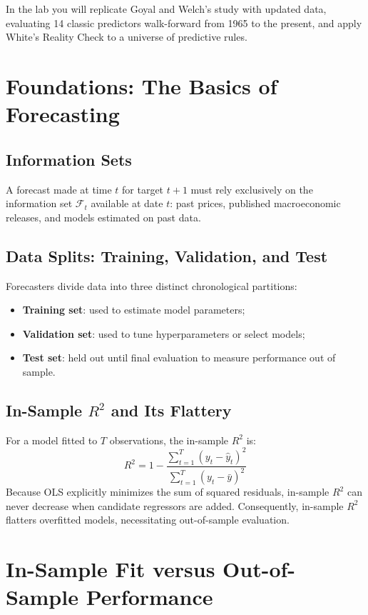 In the lab you will replicate Goyal and Welch's study with updated data, evaluating 14 classic predictors walk-forward from 1965 to the present, and apply White's Reality Check to a universe of predictive rules.

\section{Foundations: The Basics of Forecasting}
\label{sec:05-foundations}

\subsection{Information Sets}
A forecast made at time $t$ for target $t+1$ must rely exclusively on the information set $\mathcal{F}_t$ available at date $t$: past prices, published macroeconomic releases, and models estimated on past data.

\subsection{Data Splits: Training, Validation, and Test}
Forecasters divide data into three distinct chronological partitions:
\begin{itemize}
  \item \textbf{Training set}: used to estimate model parameters;
  \item \textbf{Validation set}: used to tune hyperparameters or select models;
  \item \textbf{Test set}: held out until final evaluation to measure performance out of sample.
\end{itemize}

\subsection{In-Sample $R^2$ and Its Flattery}
For a model fitted to $T$ observations, the in-sample $R^2$ is:
\begin{equation}
  R^2 = 1 - \frac{\sum_{t=1}^T (y_t - \hat{y}_t)^2}{\sum_{t=1}^T (y_t - \bar{y})^2}
  \label{eq:05-r2}
\end{equation}
Because OLS explicitly minimizes the sum of squared residuals, in-sample $R^2$ can never decrease when candidate regressors are added. Consequently, in-sample $R^2$ flatters overfitted models, necessitating out-of-sample evaluation.

\section{In-Sample Fit versus Out-of-Sample Performance}
\label{sec:05-insample}

